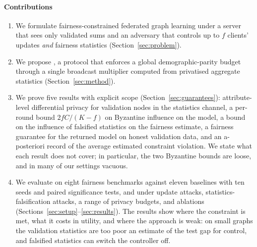 \paragraph{Contributions}
\begin{enumerate}
\item We formulate fairness-constrained federated graph learning under a server that sees only validated sums and an adversary that controls up to $f$ clients' updates \emph{and} fairness statistics (Section~\ref{sec:problem}).
\item We propose \clamp{}, a protocol that enforces a global demographic-parity budget through a single broadcast multiplier computed from privatised aggregate statistics (Section~\ref{sec:method}).
\item We prove five results with explicit scope (Section~\ref{sec:guarantees}): attribute-level differential privacy for validation nodes in the statistics channel, a per-round bound $2fC/(K-f)$ on Byzantine influence on the model, a bound on the influence of falsified statistics on the fairness estimate, a fairness guarantee for the returned model on honest validation data, and an a-posteriori record of the average estimated constraint violation. We state what each result does not cover; in particular, the two Byzantine bounds are loose, and in many of our settings vacuous.
\item We evaluate \clamp{} on eight fairness benchmarks against eleven baselines with ten seeds and paired significance tests, and under update attacks, statistics-falsification attacks, a range of privacy budgets, and ablations (Sections~\ref{sec:setup}--\ref{sec:results}). The results show where the constraint is met, what it costs in utility, and where the approach is weak: on small graphs the validation statistics are too poor an estimate of the test gap for control, and falsified statistics can switch the controller off.
\end{enumerate}
